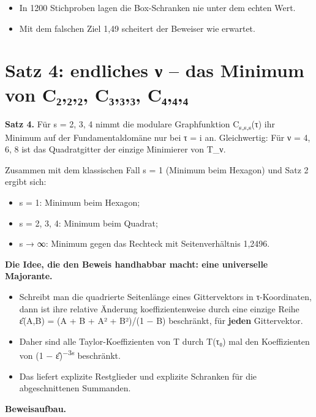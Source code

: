 \begin{itemize}
\tightlist
\item
  In 1200 Stichproben lagen die Box-Schranken nie unter dem echten Wert.
\item
  Mit dem falschen Ziel 1,49 scheitert der Beweiser wie erwartet.
\end{itemize}

\section{Satz 4: endliches ν -- das Minimum von C₂,₂,₂, C₃,₃,₃, C₄,₄,₄}

\textbf{Satz 4.} Für s = 2, 3, 4 nimmt die modulare Graphfunktion C\textsubscript{s,s,s}(τ) ihr Minimum auf der Fundamentaldomäne nur bei τ = i an. Gleichwertig: Für ν = 4, 6, 8 ist das Quadratgitter der einzige Minimierer von T\_ν.

Zusammen mit dem klassischen Fall s = 1 (Minimum beim Hexagon) und Satz 2 ergibt sich:

\begin{itemize}
\tightlist
\item
  s = 1: Minimum beim Hexagon;
\item
  s = 2, 3, 4: Minimum beim Quadrat;
\item
  s → ∞: Minimum gegen das Rechteck mit Seitenverhältnis 1,2496.
\end{itemize}

\textbf{Die Idee, die den Beweis handhabbar macht: eine universelle Majorante.}

\begin{itemize}
\tightlist
\item
  Schreibt man die quadrierte Seitenlänge eines Gittervektors in τ-Koordinaten, dann ist ihre relative Änderung koeffizientenweise durch eine einzige Reihe ε̂(A,B) = (A + B + A² + B²)/(1 − B) beschränkt, für \textbf{jeden} Gittervektor.
\item
  Daher sind alle Taylor-Koeffizienten von T durch T(τ₀) mal den Koeffizienten von (1 − ε̂)\textsuperscript{−3s} beschränkt.
\item
  Das liefert explizite Restglieder und explizite Schranken für die abgeschnittenen Summanden.
\end{itemize}

\textbf{Beweisaufbau.}

